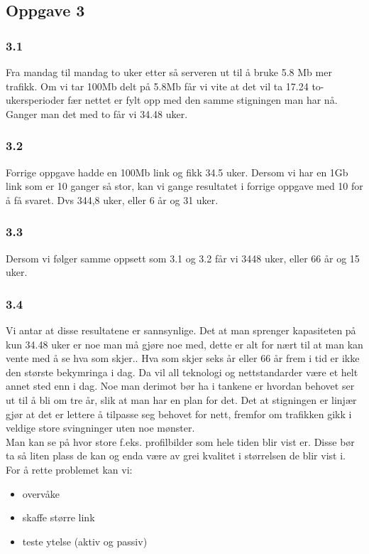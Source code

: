 \documentclass[a4paper, norsk, 12pt]{article}
\begin{document}
\subsection{Oppgave 3}
\subsubsection*{3.1}
Fra mandag til mandag to uker etter så serveren ut til å bruke 5.8 Mb mer trafikk. Om vi tar 100Mb delt på 5.8Mb får vi vite at det vil ta 17.24 to-ukersperioder fær nettet er fylt opp med den samme stigningen man har nå. Ganger man det med to får vi 34.48 uker.

\subsubsection*{3.2}
Forrige oppgave hadde en 100Mb link og fikk 34.5 uker. Dersom vi har en 1Gb link som er 10 ganger så stor, kan vi gange resultatet i forrige oppgave med 10 for å få svaret. Dvs 344,8 uker, eller 6 år og 31 uker.

\subsubsection*{3.3}
Dersom vi følger samme oppsett som 3.1 og 3.2 får vi 3448 uker, eller 66 år og 15 uker.

\subsubsection*{3.4}
Vi antar at disse resultatene er sannsynlige. Det at man sprenger kapasiteten på kun 34.48 uker er noe man må gjøre noe med, dette er alt for nært til at man kan vente med å se hva som skjer.. Hva som skjer seks år eller 66 år frem i tid er ikke den største bekymringa i dag. Da vil all teknologi og nettstandarder være et helt annet sted enn i dag. Noe man derimot bør ha i tankene er hvordan behovet ser ut til å bli om tre år, slik at man har en plan for det. Det at stigningen er linjær gjør at det er lettere å tilpasse seg behovet for nett, fremfor om trafikken gikk i veldige store svingninger uten noe mønster.\\

Man kan se på hvor store f.eks. profilbilder som hele tiden blir vist er. Disse bør ta så liten plass de kan og enda være av grei kvalitet i størrelsen de blir vist i.\\

For å rette problemet kan vi:
\begin{itemize}
\item overvåke
\item skaffe større link
\item teste ytelse (aktiv og passiv)
\end{itemize}
\end{document}
